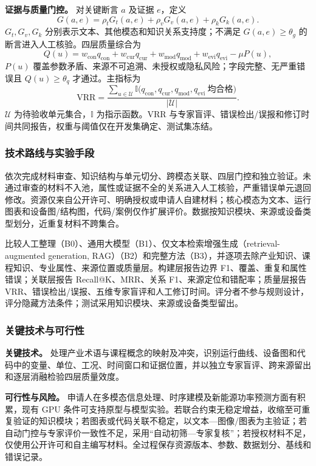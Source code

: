 \textbf{证据与质量门控。} 对关键断言 \(a\) 及证据 \(e\)，定义
\begin{equation}
G(a,e)=\rho_tG_t(a,e)+\rho_vG_v(a,e)+\rho_kG_k(a,e).
\end{equation}
\(G_t,G_v,G_k\) 分别表示文本、其他模态和知识关系支持度；不满足 \(G(a,e)\geq\theta_g\) 的断言进入人工核验。四层质量综合为
\begin{equation}
Q(u)=w_{\mathrm{con}}q_{\mathrm{con}}+
w_{\mathrm{cur}}q_{\mathrm{cur}}+
w_{\mathrm{mod}}q_{\mathrm{mod}}+
w_{\mathrm{evi}}q_{\mathrm{evi}}-\mu P(u),
\end{equation}
\(P(u)\) 覆盖参数矛盾、来源不可追溯、未授权或隐私风险；字段完整、无严重错误且 \(Q(u)\geq\theta_q\) 才通过。主指标为
\begin{equation}
\mathrm{VRR}=\frac{\sum_{u\in\mathcal{U}}\mathbb{I}
\bigl(q_{\mathrm{con}},q_{\mathrm{cur}},q_{\mathrm{mod}},q_{\mathrm{evi}}\ \mathrm{均合格}\bigr)}
{|\mathcal{U}|}.
\end{equation}
\(\mathcal{U}\) 为待验收单元集合，\(\mathbb{I}\) 为指示函数。VRR 与专家盲评、错误检出/误报和修订时间共同报告，权重与阈值仅在开发集确定、测试集冻结。

\subsubsection{技术路线与实验手段}

依次完成材料审查、知识结构与单元切分、跨模态关联、四层门控和独立验证。未通过审查的材料不入池，属性或证据不全的关系进入人工核验，严重错误单元退回修改。资源仅来自公开许可、明确授权或申请人自建材料；核心模态为文本、运行图表和设备图/结构图，代码/案例仅作扩展评价。数据按知识模块、来源或设备类型划分，近重复材料不跨集合。

比较人工整理（B0）、通用大模型（B1）、仅文本检索增强生成（retrieval-augmented generation, RAG）（B2）和完整方法（B3），并逐项去除产业知识、课程知识、专业属性、来源位置或质量层。构建层报告边界 F1、覆盖、重复和属性错误；关联层报告 Recall@K、MRR、关系 F1、来源定位和错配率；质量层报告 VRR、错误检出/误报、五维专家盲评和人工修订时间。评分者不参与规则设计，评分隐藏方法条件；测试采用知识模块、来源或设备类型留出。

\subsubsection{关键技术与可行性}

\textbf{关键技术。} 处理产业术语与课程概念的映射及冲突，识别运行曲线、设备图和代码中的变量、单位、工况、时间窗口和证据位置，并以独立专家盲评、跨来源留出和逐层消融检验四层质量效度。

\textbf{可行性与风险。} 申请人在多模态信息处理、时序建模及新能源功率预测方面有积累，现有 GPU 条件可支持原型与模型实验。若联合约束无稳定增益，收缩至可重复验证的知识模块；若图表或代码关联不稳定，以文本—图像/图表为主验证；若自动门控与专家评价一致性不足，采用“自动初筛—专家复核”；若授权材料不足，仅使用公开许可和自主编写材料。全过程保存资源版本、参数、数据划分、基线和错误记录。
